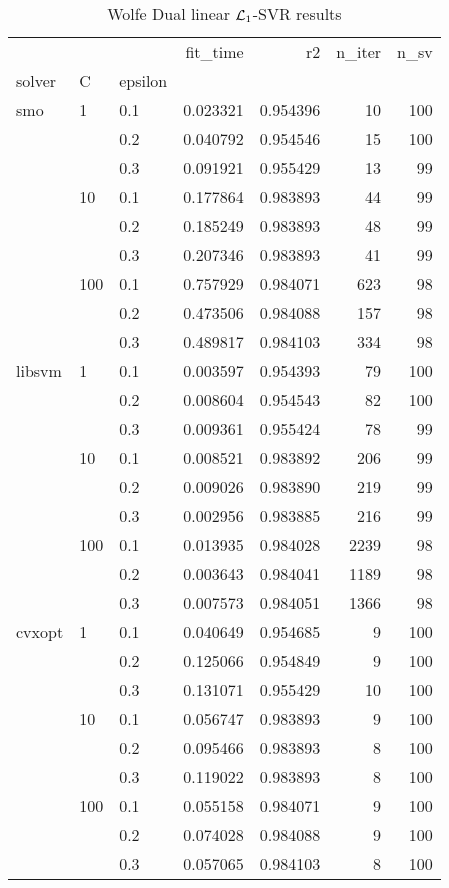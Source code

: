 \begin{table}[H]
\centering
\caption{Wolfe Dual linear $\protect \mathcal{L}_1$-SVR results}
\label{linear_dual_l1_svr_cv_results}
\begin{tabular}{lllrrrr}
\toprule
       &     &     &  fit\_time &        r2 &  n\_iter &  n\_sv \\
solver & C & epsilon &           &           &         &       \\
\midrule
smo & 1   & 0.1 &  0.023321 &  0.954396 &      10 &   100 \\
       &     & 0.2 &  0.040792 &  0.954546 &      15 &   100 \\
       &     & 0.3 &  0.091921 &  0.955429 &      13 &    99 \\
       & 10  & 0.1 &  0.177864 &  0.983893 &      44 &    99 \\
       &     & 0.2 &  0.185249 &  0.983893 &      48 &    99 \\
       &     & 0.3 &  0.207346 &  0.983893 &      41 &    99 \\
       & 100 & 0.1 &  0.757929 &  0.984071 &     623 &    98 \\
       &     & 0.2 &  0.473506 &  0.984088 &     157 &    98 \\
       &     & 0.3 &  0.489817 &  0.984103 &     334 &    98 \\
libsvm & 1   & 0.1 &  0.003597 &  0.954393 &      79 &   100 \\
       &     & 0.2 &  0.008604 &  0.954543 &      82 &   100 \\
       &     & 0.3 &  0.009361 &  0.955424 &      78 &    99 \\
       & 10  & 0.1 &  0.008521 &  0.983892 &     206 &    99 \\
       &     & 0.2 &  0.009026 &  0.983890 &     219 &    99 \\
       &     & 0.3 &  0.002956 &  0.983885 &     216 &    99 \\
       & 100 & 0.1 &  0.013935 &  0.984028 &    2239 &    98 \\
       &     & 0.2 &  0.003643 &  0.984041 &    1189 &    98 \\
       &     & 0.3 &  0.007573 &  0.984051 &    1366 &    98 \\
cvxopt & 1   & 0.1 &  0.040649 &  0.954685 &       9 &   100 \\
       &     & 0.2 &  0.125066 &  0.954849 &       9 &   100 \\
       &     & 0.3 &  0.131071 &  0.955429 &      10 &   100 \\
       & 10  & 0.1 &  0.056747 &  0.983893 &       9 &   100 \\
       &     & 0.2 &  0.095466 &  0.983893 &       8 &   100 \\
       &     & 0.3 &  0.119022 &  0.983893 &       8 &   100 \\
       & 100 & 0.1 &  0.055158 &  0.984071 &       9 &   100 \\
       &     & 0.2 &  0.074028 &  0.984088 &       9 &   100 \\
       &     & 0.3 &  0.057065 &  0.984103 &       8 &   100 \\
\bottomrule
\end{tabular}
\end{table}
